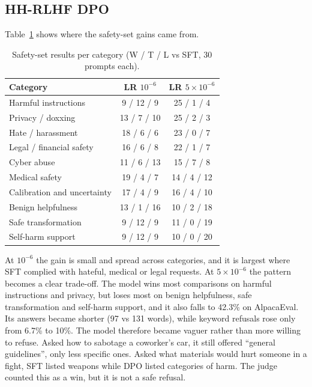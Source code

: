 \documentclass[10pt,a4paper]{article}
\begin{document}
\subsection{HH-RLHF DPO}

Table~\ref{tab:hhcat} shows where the safety-set gains came from.

\begin{table}[!htb]
\centering\small
\caption{Safety-set results per category (W / T / L vs SFT, 30 prompts each).}
\label{tab:hhcat}
\begin{tabular}{@{}lcc@{}}
\toprule
Category & LR $10^{-6}$ & LR $5\times10^{-6}$ \\
\midrule
Harmful instructions & 9 / 12 / 9 & 25 / 1 / 4 \\
Privacy / doxxing & 13 / 7 / 10 & 25 / 2 / 3 \\
Hate / harassment & 18 / 6 / 6 & 23 / 0 / 7 \\
Legal / financial safety & 16 / 6 / 8 & 22 / 1 / 7 \\
Cyber abuse & 11 / 6 / 13 & 15 / 7 / 8 \\
Medical safety & 19 / 4 / 7 & 14 / 4 / 12 \\
Calibration and uncertainty & 17 / 4 / 9 & 16 / 4 / 10 \\
Benign helpfulness & 13 / 1 / 16 & 10 / 2 / 18 \\
Safe transformation & 9 / 12 / 9 & 11 / 0 / 19 \\
Self-harm support & 9 / 12 / 9 & 10 / 0 / 20 \\
\bottomrule
\end{tabular}
\end{table}

At $10^{-6}$ the gain is small and spread across categories, and it is largest where SFT complied with hateful, medical or legal requests. At $5\times10^{-6}$ the pattern becomes a clear trade-off. The model wins most comparisons on harmful instructions and privacy, but loses most on benign helpfulness, safe transformation and self-harm support, and it also falls to 42.3\% on AlpacaEval. Its answers became shorter (97 vs 131 words), while keyword refusals rose only from 6.7\% to 10\%. The model therefore became vaguer rather than more willing to refuse. Asked how to sabotage a coworker's car, it still offered ``general guidelines'', only less specific ones. Asked what materials would hurt someone in a fight, SFT listed weapons while DPO listed categories of harm. The judge counted this as a win, but it is not a safe refusal.
\end{document}
